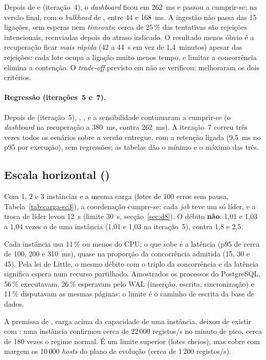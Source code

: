 Depois de  e  (iteração~4), o \emph{dashboard} ficou em 262~ms e  passou a cumprir-se; na
versão final, com o \emph{bulkhead} de , entre 44 e 168~ms. A ingestão não passa das 15 ligações, sem esperas nem
\emph{timeouts}; cerca de 25\,\% das tentativas são rejeições intencionais, reenviadas depois do atraso indicado. O
resultado menos óbvio é a recuperação ficar \emph{mais rápida} (42 a 44~s em vez de 1,4~minutos) apesar das rejeições:
cada lote ocupa a ligação muito menos tempo, e limitar a concorrência elimina a contenção. O \emph{trade-off}
previsto em  não se verificou: melhoraram os dois critérios.

\paragraph{Regressão (iterações~5 e~7).}
Depois de  (iteração~5), , ,  e a sensibilidade continuaram a cumprir-se (o
\emph{dashboard} na recuperação a 380~ms, contra 262~ms). A iteração~7 correu três vezes todos os cenários sobre a versão
entregue, com a retenção ligada (9,5~ms no p95 por execução), sem regressões; as tabelas dão o mínimo e o
máximo das três.

\subsection{Escala horizontal ()}
\label{sec:aval-sc3}


Com 1, 2 e 3 instâncias e a mesma carga (lotes de 100 erros sem pausa, Tabela~\ref{tab:carga-sc3}), a coordenação
cumpre-se: cada \emph{job} teve um só líder, e a troca de líder levou 12~s (limite 30~s, secção~\ref{sec:d8}). O
débito \textbf{não}: 1,01 e 1,03 a 1,04 vezes o de uma instância (1,01 e 1,03 na iteração~5), contra 1,8 e 2,5.

Cada instância usa 11\,\% ou menos do CPU; o que sobe é a latência (p95 de cerca de 100, 200 e 310~ms), quase na proporção
da concorrência admitida (15, 30 e 45). Pela lei de Little, o mesmo débito com o triplo da concorrência e da
latência significa espera num recurso partilhado. Amostrados os processos do PostgreSQL, 56\,\% executavam, 26\,\%
esperavam pelo WAL (inserção, escrita, sincronização) e 11\,\% disputavam as mesmas páginas: o limite é o caminho de
escrita da base de dados.

A premissa de , carga acima da capacidade de uma instância, deixou de existir com : uma instância
confirmou cerca de 22\,000 registos/s no minuto de pico, cerca de 180 vezes o regime normal. É um limite superior
(lotes cheios), mas cobre com margem os 10\,000 \emph{hosts} do plano de evolução (cerca de 1\,200 registos/s).


